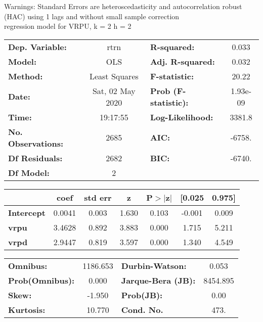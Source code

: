 Warnings: \newline
 [1] Standard Errors are heteroscedasticity and autocorrelation robust (HAC) using 1 lags and without small sample correction\\ 

regression model for VRPU, k = 2 h = 2\begin{center}
\begin{tabular}{lclc}
\toprule
\textbf{Dep. Variable:}    &       rtrn       & \textbf{  R-squared:         } &     0.033   \\
\textbf{Model:}            &       OLS        & \textbf{  Adj. R-squared:    } &     0.032   \\
\textbf{Method:}           &  Least Squares   & \textbf{  F-statistic:       } &     20.22   \\
\textbf{Date:}             & Sat, 02 May 2020 & \textbf{  Prob (F-statistic):} &  1.93e-09   \\
\textbf{Time:}             &     19:17:55     & \textbf{  Log-Likelihood:    } &    3381.8   \\
\textbf{No. Observations:} &        2685      & \textbf{  AIC:               } &    -6758.   \\
\textbf{Df Residuals:}     &        2682      & \textbf{  BIC:               } &    -6740.   \\
\textbf{Df Model:}         &           2      & \textbf{                     } &             \\
\bottomrule
\end{tabular}
\begin{tabular}{lcccccc}
                   & \textbf{coef} & \textbf{std err} & \textbf{z} & \textbf{P$> |$z$|$} & \textbf{[0.025} & \textbf{0.975]}  \\
\midrule
\textbf{Intercept} &       0.0041  &        0.003     &     1.630  &         0.103        &       -0.001    &        0.009     \\
\textbf{vrpu}      &       3.4628  &        0.892     &     3.883  &         0.000        &        1.715    &        5.211     \\
\textbf{vrpd}      &       2.9447  &        0.819     &     3.597  &         0.000        &        1.340    &        4.549     \\
\bottomrule
\end{tabular}
\begin{tabular}{lclc}
\textbf{Omnibus:}       & 1186.653 & \textbf{  Durbin-Watson:     } &    0.053  \\
\textbf{Prob(Omnibus):} &   0.000  & \textbf{  Jarque-Bera (JB):  } & 8454.895  \\
\textbf{Skew:}          &  -1.950  & \textbf{  Prob(JB):          } &     0.00  \\
\textbf{Kurtosis:}      &  10.770  & \textbf{  Cond. No.          } &     473.  \\
\bottomrule
\end{tabular}
\end{center}

